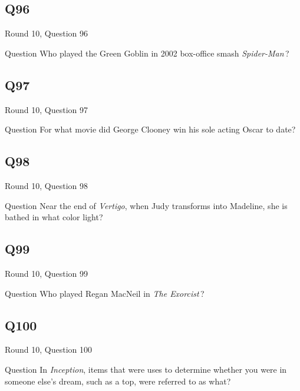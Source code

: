\documentclass[11pt]{beamer}
\begin{document}
\subsection*{Q96}
\begin{frame}[t]{Round 10, Question 96}
  \vspace{2em}
  \begin{block}{Question}
    Who played the Green Goblin in 2002 box-office smash \emph{Spider-Man}\,?
  \end{block}
\end{frame}


\subsection*{Q97}
\begin{frame}[t]{Round 10, Question 97}
  \vspace{2em}
  \begin{block}{Question}
    For what movie did George Clooney win his sole acting Oscar to date?
  \end{block}
\end{frame}


\subsection*{Q98}
\begin{frame}[t]{Round 10, Question 98}
  \vspace{2em}
  \begin{block}{Question}
    Near the end of \emph{Vertigo}, when Judy transforms into Madeline, she is bathed in what color light?
  \end{block}
\end{frame}


\subsection*{Q99}
\begin{frame}[t]{Round 10, Question 99}
  \vspace{2em}
  \begin{block}{Question}
    Who played Regan MacNeil in \emph{The Exorcist}\,?
  \end{block}
\end{frame}


\subsection*{Q100}
\begin{frame}[t]{Round 10, Question 100}
  \vspace{2em}
  \begin{block}{Question}
    In \emph{Inception}, items that were uses to determine whether you were in someone else's dream, such as a top, were referred to as what?
  \end{block}
\end{frame}
\end{document}
